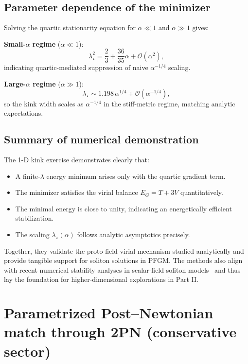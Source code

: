 \documentclass{article}
\begin{document}
\subsection{Parameter dependence of the minimizer}
\label{subsec:params}

Solving the quartic stationarity equation for $\alpha\ll1$ and $\alpha\gg1$ gives:

\textbf{Small-$\alpha$ regime} ($\alpha\ll1$):
\[
\lambda_\star^2 = \frac{2}{3} + \frac{36}{35}\alpha + \mathcal O(\alpha^2),
\]
indicating quartic-mediated suppression of naive $\alpha^{-1/4}$ scaling.

\textbf{Large-$\alpha$ regime} ($\alpha\gg1$):
\[
\lambda_\star \sim 1.198\,\alpha^{1/4} + \mathcal O(\alpha^{-1/4}),
\]
so the kink width scales as $\alpha^{-1/4}$ in the stiff-metric regime, matching analytic expectations.

\subsection{Summary of numerical demonstration}
\label{subsec:numerical_summary}

The 1-D kink exercise demonstrates clearly that:
\begin{itemize}
\item A finite-$\lambda$ energy minimum arises only with the quartic gradient term.
\item The minimizer satisfies the virial balance $E_G = T + 3V$ quantitatively.
\item The minimal energy is close to unity, indicating an energetically efficient stabilization.
\item The scaling $\lambda_\star(\alpha)$ follows analytic asymptotics precisely.
\end{itemize}
Together, they validate the proto-field virial mechanism studied analytically and provide tangible support for soliton solutions in PFGM. The methods also align with recent numerical stability analyses in scalar-field soliton models~\cite{GonzalezLopez2025_KinkStability,Allamon2025_NumericalSolitons} and thus lay the foundation for higher-dimensional explorations in Part II.

\section{Parametrized Post--Newtonian match through 2PN (conservative sector)}
\label{sec:PPN}
\end{document}
